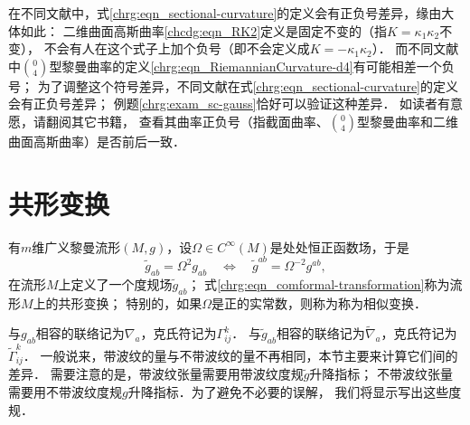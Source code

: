 
\begin{exercise}
	在不同文献中，式\eqref{chrg:eqn_sectional-curvature}的定义会有正负号差异，缘由大体如此：
	二维曲面高斯曲率\eqref{chcdg:eqn_RK2}定义是固定不变的（指$K=\kappa_1 \kappa_2$不变），
	不会有人在这个式子上加个负号（即不会定义成$K=-\kappa_1 \kappa_2$）．
	而不同文献中$\binom{0}{4}$型黎曼曲率的定义\eqref{chrg:eqn_RiemannianCurvature-d4}有可能相差一个负号；
	为了调整这个符号差异，不同文献在式\eqref{chrg:eqn_sectional-curvature}的定义会有正负号差异；
	例题\ref{chrg:exam_sc-gauss}恰好可以验证这种差异．	如读者有意愿，请翻阅其它书籍，
	查看其曲率正负号（指截面曲率、$\binom{0}{4}$型黎曼曲率和二维曲面高斯曲率）是否前后一致．
\end{exercise}


\section{共形变换}\label{chrg:sec_comformal-transformation}
有$m$维广义黎曼流形$(M,g)$，设$\Omega \in C^\infty(M)$是处处恒正函数场，于是
\begin{equation}\label{chrg:eqn_comformal-transformation}
    \tilde{g}_{ab} = \Omega^2 g_{ab} \quad \Leftrightarrow \quad
    \tilde{g}^{ab} = \Omega^{-2} g^{ab},
\end{equation}
在流形$M$上定义了一个度规场$\tilde{g}_{ab}$；
式\eqref{chrg:eqn_comformal-transformation}称为流形$M$上的{\heiti 共形变换}；
特别的，如果$\Omega$是正的实常数，则称为称为{\heiti 相似变换}．

与$g_{ab}$相容的联络记为$\nabla_a$，克氏符记为$\Gamma_{ij}^k$．
与$\tilde{g}_{ab}$相容的联络记为$\tilde{\nabla}_a$，克氏符记为$\tilde{\Gamma}_{ij}^k$．
一般说来，带波纹的量与不带波纹的量不再相同，本节主要来计算它们间的差异．
需要注意的是，带波纹张量需要用带波纹度规$\tilde{g}$升降指标；
不带波纹张量需要用不带波纹度规$g$升降指标．为了避免不必要的误解，
我们将显示写出这些度规．


